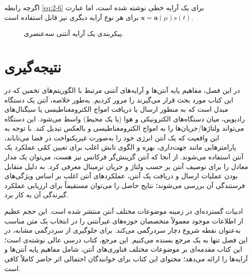 اگرچه رابطه \eqref{eq:2-6} برای یک آرایه خطی نوشته شده است، اما عبارت $\bm{x} = \bm{a}(\mu)s(t)$ برای هر نوع آرایه دیگری نیز قابل استفاده است.

\begin{figure}[ht]
	\centering
	\caption{پیکربندی یک آرایه آنتنی سه‌عنصری.}
	\label{fig:2-9}
\end{figure}




\section{نتیجه‌گیری}
\label{sec:2-4}

در این فصل، مفاهیم پایه آنتن‌ها و آرایه‌های آنتنی مرتبط با الگوریتم‌های تخمین  که در این کتاب مورد بحث قرار می‌گیرند را مرور کردیم. به‌طور خلاصه، آنتن یک دستگاه مبدل است که به منظور ارسال یا دریافت امواج الکترومغناطیسی یا سیگنال‌های رادیویی، میان دستگاه‌های الکترونیکی و هوا (یا یک محیط) واسط می‌شود. این دستگاه می‌تواند ولتاژها/جریان‌ها را به امواج الکترومغناطیسی و بالعکس تبدیل کند. با توجه به این واقعیت که یک آنتن انرژی خود را به‌صورت غیریکنواخت در فضا می‌تاباند، پارامترهایی مانند جهت‌داری، بهره و الگوی تابش اغلب برای تعیین کمّی عملکرد یک آنتن استفاده می‌شوند. از آنجا که آنتن گزینش‌گر فرکانس نیز هست، می‌توان یک مدار معادل را برای توصیف آنتن بر حسب ولتاژ و جریان ترمینال معرفی کرد. به دلیل متقابل بودن عملیات ارسال و دریافت یک آنتن، عملکردهای آنتن اغلب بر اساس ویژگی‌های فرستندگی آن بررسی می‌شوند؛ نتایج حاصل را می‌توان مستقیماً برای ارزیابی عملکرد گیرندگی آن به کار برد.

ادبیات گسترده‌ای در زمینه موضوعات مختلف آنتن منتشر شده است. این حجم عظیم از اطلاعات موجود معمولاً متخصصان حوزه‌های غیرآنتنی را در انتخاب یک متن مناسب به‌عنوان نقطه شروع دچار سردرگمی می‌کند. برای جلوگیری از سردرگمی مشابه، در این فصل تنها به یک مرجع بسنده می‌کنیم. این مرجع، کتاب درسی عالی نوشته‌ی  \cite{1} است؛ این کتاب مقدمه‌ای بر موضوعات مختلف فناوری‌های آنتن، شامل مفاهیم پایه آنتن‌ها و آرایه‌ها را ارائه می‌دهد؛ محتوای این کتاب برای خوانندگان احتمالی اثر حاضر کاملاً کافی است.









